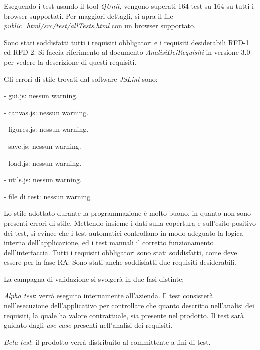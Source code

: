 Eseguendo i test usando il tool \textit{QUnit}, vengono superati 164 test su 164 su tutti i browser supportati. Per maggiori dettagli, si apra il file \textit{public{\_}html/src/test/allTests.html} con un browser supportato.

Sono stati soddisfatti tutti i requisiti obbligatori e i requisiti desiderabili RFD-1 ed RFD-2. Si faccia riferimento al documento \textit{AnalisiDeiRequisiti} in versione 3.0 per vedere la descrizione di questi requisiti.

Gli errori di stile trovati dal software \textit{JSLint} sono:
\begin{elencopuntato}[\subsubsecindent]
\item[-] gui.js: nessun warning.
\item[-] canvas.js: nessun warning.
\item[-] figures.js: nessun warning.
\item[-] save.js: nessun warning.
\item[-] load.js: nessun warning.
\item[-] utils.js: nessun warning.
\item[-] file di test: nessun warning
\end{elencopuntato}

 Lo stile adottato durante la programmazione \`e molto buono, in quanto non sono presenti errori di stile. Mettendo insieme i dati sulla copertura e sull'esito positivo dei test, si evince che i test automatici controllano in modo adeguato la logica interna dell'applicazione, ed i test manuali il corretto funzionamento dell'interfaccia. Tutti i requisiti obbligatori sono stati soddisfatti, come deve essere per la fase RA. Sono stati anche soddisfatti due requisiti desiderabili.

 
 
 
La campagna di validazione si svolger\`a in due fasi distinte:
\begin{elenconumerato}[\textbf{}]{\subsubsecindent}
\item \textit{Alpha test}: verr\`a eseguito internamente all'azienda. Il test consister\`a nell'esecuzione dell'applicativo per controllare che quanto descritto nell'analisi dei requisiti, la quale ha valore contrattuale, sia presente nel prodotto. Il test sar\`a guidato dagli \textit{use case} presenti nell'analisi dei requisiti.
\item \textit{Beta test}: il prodotto verr\`a distribuito al committente a fini di test.
\end{elenconumerato}
 

 
